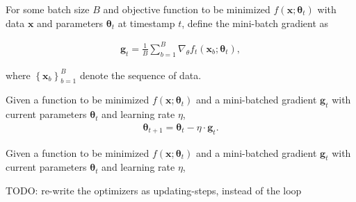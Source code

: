 \begin{definition}
  For some batch size $B$ and objective function to be minimized
  $f \left(\mathbf{x} ; \boldsymbol\theta_t\right)$ with
  data $\mathbf{x}$ and
  parameters $\boldsymbol\theta_t$ at timestamp $t$,
  define the mini-batch gradient as

  \begin{equation}
    \begin{aligned}
      \mathbf{g}_t =
      \frac1B \sum_{b=1}^B \nabla_\theta f_t(\mathbf{x}_b; \boldsymbol\theta_{t}),
    \end{aligned}
  \end{equation}

  where $\left\{\mathbf{x}_b\right\}_{b = 1}^{B}$ denote the sequence of data.
\end{definition}


\begin{update}
  Given a function to be minimized $f \left(\mathbf{x} ; \boldsymbol\theta_t\right)$
  and a mini-batched gradient $\mathbf{g}_t$
  with current parameters $\boldsymbol\theta_t$
  and learning rate $\eta$,
  \begin{equation*}
    \begin{aligned}
      \boldsymbol\theta_{t+1} = \boldsymbol\theta_t - \eta \cdot \mathbf{g}_t.
    \end{aligned}
  \end{equation*}
\end{update}

\begin{update}
  Given a function to be minimized $f \left(\mathbf{x} ; \boldsymbol\theta_t\right)$
  and a mini-batched gradient $\mathbf{g}_t$
  with current parameters $\boldsymbol\theta_t$
  and learning rate $\eta$,
\end{update}








TODO: {\color{red}
re-write the optimizers as updating-steps, instead of the loop
}


